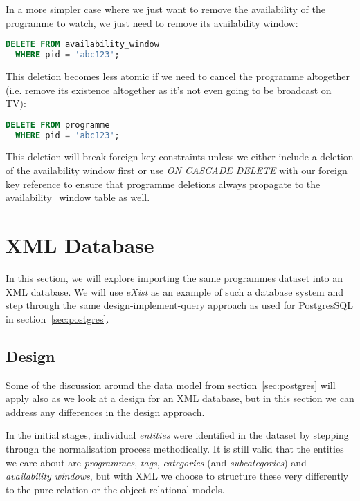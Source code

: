 \documentclass[11pt,a4paper]{article}
\begin{document}
In a more simpler case where we just want to remove the availability of
the programme to watch, we just need to remove its availability window:

\begin{lstlisting}[language=SQL]
  DELETE FROM availability_window
  WHERE pid = 'abc123';
\end{lstlisting}

This deletion becomes less atomic if we need to cancel the programme
altogether (i.e. remove its existence altogether as it's not
even going to be broadcast on TV):

\begin{lstlisting}[language=SQL]
  DELETE FROM programme
  WHERE pid = 'abc123';
\end{lstlisting}

This deletion will break foreign key constraints unless we either
include a deletion of the availability window first or use
\emph{ON CASCADE DELETE} with our foreign key reference to ensure
that programme deletions always propagate to the
availability\_window table as well.

\section{XML Database}

In this section, we will explore importing the same programmes dataset
into an XML database. We will use \emph{eXist} as an example of such
a database system and step through the same design-implement-query
approach as used for PostgresSQL in section~\ref{sec:postgres}.

\subsection{Design}

Some of the discussion around the data model from section~\ref{sec:postgres}
will apply also as we look at a design for an XML database, but
in this section we can address any differences in the design approach.

In the initial stages, individual \emph{entities} were identified in the
dataset by stepping through the normalisation process methodically. It
is still valid that the entities we care about are \emph{programmes},
\emph{tags}, \emph{categories} (and \emph{subcategories}) and
\emph{availability windows}, but with XML we choose to structure these
very differently to the pure relation or the object-relational models.
\end{document}
